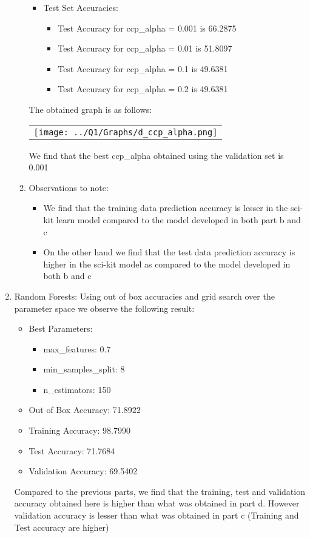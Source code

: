 \begin{enumerate}[label=(\alph*)]
\begin{enumerate}[label=\roman*.]
\begin{itemize}
\begin{itemize}
        \end{itemize}
        \item Test Set Accuracies:
        \begin{itemize}
            \item Test Accuracy for ccp\_alpha = 0.001 is 66.2875
            \item Test Accuracy for ccp\_alpha = 0.01 is 51.8097
            \item Test Accuracy for ccp\_alpha = 0.1 is 49.6381
            \item Test Accuracy for ccp\_alpha = 0.2 is 49.6381
        \end{itemize}
    \end{itemize}
    \newpage
    The obtained graph is as follows:
    \begin{center}
        \begin{tabular}{c}
            \texttt{[image: ../Q1/Graphs/d\_ccp\_alpha.png]}
        \end{tabular}
    \end{center}
     We find that the best ccp\_alpha obtained using the validation set is 0.001
    \item Observations to note:
    \begin{itemize}
        \item We find that the training data prediction accuracy is lesser in the sci-kit learn model compared to the model developed in both part b and c
        \item On the other hand we find that the test data prediction accuracy is higher in the sci-kit model as compared to the model developed in both b and c
    \end{itemize}
\end{enumerate}

\item Random Forests: Using out of box accuracies and grid search over the parameter space we observe the following result:
    \begin{itemize}
        \item Best Parameters:
            \begin{itemize}
                \item max\_features: 0.7
                \item min\_samples\_split: 8
                \item n\_estimators: 150
            \end{itemize}
        \item Out of Box Accuracy: 71.8922
        \item Training Accuracy: 98.7990 
        \item Test Accuracy: 71.7684
        \item Validation Accuracy: 69.5402
    \end{itemize}
    Compared to the previous parts, we find that the training, test and validation accuracy obtained here is higher than what was obtained in part d. However validation accuracy is lesser than what was obtained in part c (Training and Test accuracy are higher)




\end{enumerate}
